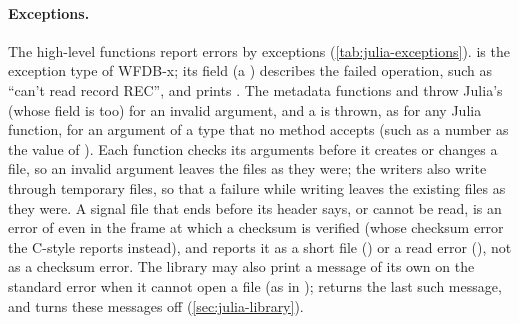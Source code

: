 \paragraph{Exceptions.} The high-level functions report errors by exceptions
(\cref{tab:julia-exceptions}).  is the exception type of WFDB-x; its field
 (a ) describes the failed operation, such as ``can't read record
REC'', and  prints . The metadata functions and
 throw Julia's  (whose field is  too)
for an invalid argument, and a  is thrown, as for any Julia function,
for an argument of a type that no method accepts (such as a number as the value of
). Each function checks its arguments before it creates or changes a
file, so an invalid argument leaves the files as they were; the writers also write
through temporary files, so that a failure while writing leaves the existing files as
they were. A signal file that ends before its header says, or cannot be read, is an error
of  even in the frame at which a checksum is verified (whose checksum
error the C-style  reports instead), and  reports it as
a short file () or a read error (), not as a
checksum error. The library may also print a message of its own on the standard error
when it cannot open a file (as in );
 returns the last such message, and  turns these
messages off (\cref{sec:julia-library}).

